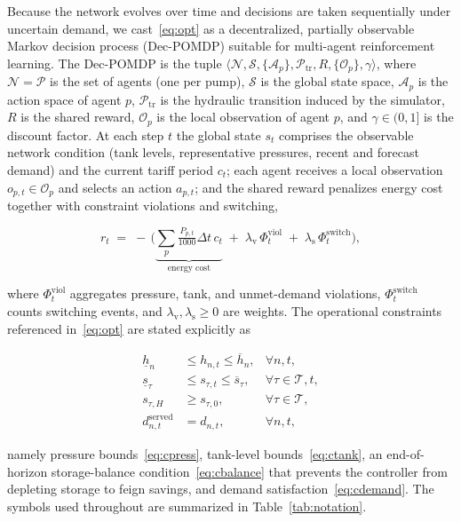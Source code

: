 \documentclass[11pt,a4paper]{article}
\begin{document}
Because the network evolves over time and decisions are taken sequentially under
uncertain demand, we cast~\eqref{eq:opt} as a decentralized, partially observable
Markov decision process (Dec-POMDP) suitable for multi-agent reinforcement
learning. The Dec-POMDP is the tuple
$\langle \mathcal{N}, \mathcal{S}, \{\mathcal{A}_p\}, \mathcal{P}_{\mathrm{tr}},
R, \{\mathcal{O}_p\}, \gamma \rangle$, where $\mathcal{N} = \mathcal{P}$ is the
set of agents (one per pump), $\mathcal{S}$ is the global state space,
$\mathcal{A}_p$ is the action space of agent $p$,
$\mathcal{P}_{\mathrm{tr}}$ is the hydraulic transition induced by the simulator,
$R$ is the shared reward, $\mathcal{O}_p$ is the local observation of agent $p$,
and $\gamma \in (0,1]$ is the discount factor. At each step $t$ the global state
$s_t$ comprises the observable network condition (tank levels, representative
pressures, recent and forecast demand) and the current tariff period $c_t$; each
agent receives a local observation $o_{p,t} \in \mathcal{O}_p$ and selects an
action $a_{p,t}$; and the shared reward penalizes energy cost together with
constraint violations and switching,

\begin{equation}
\label{eq:reward}
r_t \;=\; -\,\Big( \underbrace{\textstyle\sum_{p} \tfrac{P_{p,t}}{1000}\Delta t\, c_t}_{\text{energy cost}}
\;+\; \lambda_{\mathrm{v}}\, \Phi^{\mathrm{viol}}_t
\;+\; \lambda_{\mathrm{s}}\, \Phi^{\mathrm{switch}}_t \Big),
\end{equation}

where $\Phi^{\mathrm{viol}}_t$ aggregates pressure, tank, and unmet-demand
violations, $\Phi^{\mathrm{switch}}_t$ counts switching events, and
$\lambda_{\mathrm{v}}, \lambda_{\mathrm{s}} \ge 0$ are weights. The operational
constraints referenced in~\eqref{eq:opt} are stated explicitly as

\begin{align}
\underline{h}_n &\le h_{n,t} \le \overline{h}_n, & \forall n, t, \label{eq:cpress}\\
\underline{s}_\tau &\le s_{\tau,t} \le \overline{s}_\tau, & \forall \tau \in \mathcal{T}, t, \label{eq:ctank}\\
s_{\tau,H} &\ge s_{\tau,0}, & \forall \tau \in \mathcal{T}, \label{eq:cbalance}\\
d_{n,t}^{\mathrm{served}} &= d_{n,t}, & \forall n, t, \label{eq:cdemand}
\end{align}

namely pressure bounds~\eqref{eq:cpress}, tank-level bounds~\eqref{eq:ctank}, an
end-of-horizon storage-balance condition~\eqref{eq:cbalance} that prevents the
controller from depleting storage to feign savings, and demand
satisfaction~\eqref{eq:cdemand}. The symbols used throughout are summarized in
Table~\ref{tab:notation}.
\end{document}
